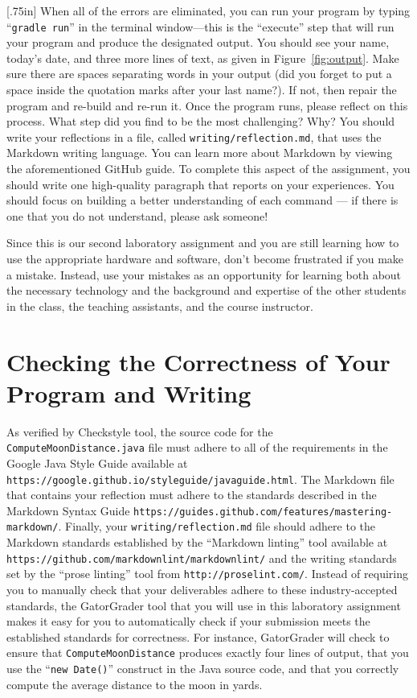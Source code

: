 \documentclass[11pt]{article}
\newcommand{\mainprogram}{\lstinline{ComputeMoonDistance}}
\newcommand{\mainprogramjava}{\lstinline{ComputeMoonDistance.java}}
\newcommand{\reflection}{\lstinline{writing/reflection.md}}
\newcommand{\gradlerun}{\command{gradle run}}
\newcommand{\command}[1]{``\lstinline{#1}''}
\newcommand{\url}[1]{\lstinline{#1}}
\newcommand{\step}[1]{``{#1}''}
\newcommand{\think}[1]{\null\hfill\LARGE{\faCogs{}}\newline\scriptsize{\em{#1}}}
\begin{document}
\marginnote{\think{Reflect on challenges}}[.75in] When all of the errors are
eliminated, you can run your program by typing \gradlerun{} in the terminal
window---this is the ``execute'' step that will run your program and produce the
designated output. You should see your name, today's date, and three more lines
of text, as given in Figure~\ref{fig:output}. Make sure there are spaces
separating words in your output (did you forget to put a space inside the
quotation marks after your last name?). If not, then repair the program and
re-build and re-run it. Once the program runs, please reflect on this process.
What step did you find to be the most challenging? Why? You should write your
reflections in a file, called \reflection{}, that uses the Markdown writing
language. You can learn more about Markdown by viewing the aforementioned GitHub
guide. To complete this aspect of the assignment, you should write one
high-quality paragraph that reports on your experiences. You should focus on
building a better understanding of each command --- if there is one that you do
not understand, please ask someone!

Since this is our second laboratory assignment and you are still learning how to
use the appropriate hardware and software, don't become frustrated if you make a
mistake. Instead, use your mistakes as an opportunity for learning both about
the necessary technology and the background and expertise of the other students
in the class, the teaching assistants, and the course instructor.

\section*{Checking the Correctness of Your Program and Writing}

As verified by Checkstyle tool, the source code for the \mainprogramjava{} file
must adhere to all of the requirements in the Google Java Style Guide available
at \url{https://google.github.io/styleguide/javaguide.html}. The Markdown file
that contains your reflection must adhere to the standards described in the
Markdown Syntax Guide
\url{https://guides.github.com/features/mastering-markdown/}. Finally, your
\reflection{} file should adhere to the Markdown standards established by the
\step{Markdown linting} tool available at
\url{https://github.com/markdownlint/markdownlint/} and the writing standards
set by the \step{prose linting} tool from \url{http://proselint.com/}. Instead
of requiring you to manually check that your deliverables adhere to these
industry-accepted standards, the GatorGrader tool that you will use in this
laboratory assignment makes it easy for you to automatically check if your
submission meets the established standards for correctness. For instance,
GatorGrader will check to ensure that \mainprogram{} produces exactly four lines
of output, that you use the \command{new Date()} construct in the Java source
code, and that you correctly compute the average distance to the moon in yards.
\end{document}
